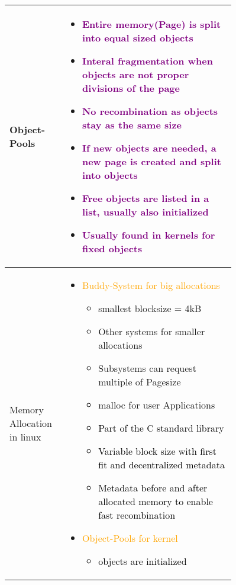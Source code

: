 \documentclass[main.tex,fontsize=8pt,paper=a4,paper=portrait,DIV=calc,]{scrartcl}
\begin{document}
\begin{table}[h!]
\begin{tabular}{|m{0,2\linewidth}|m{0.755\linewidth}|}
\hline
Object-Pools & 
\vspace{2mm}
\begin{itemize}
\item \textcolor{purple}{Entire memory(Page) is split into equal sized objects}
\item \textcolor{purple}{Interal fragmentation when objects are not proper divisions of the page}
\item \textcolor{purple}{No recombination as objects stay as the same size}
\item \textcolor{purple}{If new objects are needed, a new page is created and split into objects}
\item \textcolor{purple}{Free objects are listed in a list, usually also initialized}
\item \textcolor{purple}{Usually found in kernels for fixed objects}
\vspace{-3mm}
\end{itemize} \\
\hline
Memory Allocation in linux &
\vspace{2mm}
\begin{itemize}
\item \textcolor{orange}{Buddy-System for big allocations}\newline
  \begin{itemize}
\item smallest blocksize = 4kB
\item Other systems for smaller allocations
\item Subsystems can request multiple of Pagesize
\item malloc for user Applications
  \end{itemize} 
  \begin{itemize}
  \item \textcolor{black}{Part of the C standard library}
  \item \textcolor{black}{Variable block size with first fit and decentralized metadata}
  \item \textcolor{black}{Metadata before and after allocated memory to enable fast recombination}
  \end{itemize}
\item \textcolor{orange}{Object-Pools for kernel}\newline
\begin{itemize}
\item \textcolor{black}{objects are initialized}

\end{itemize}
\end{itemize}
\end{tabular}
\end{table}
\end{document}
